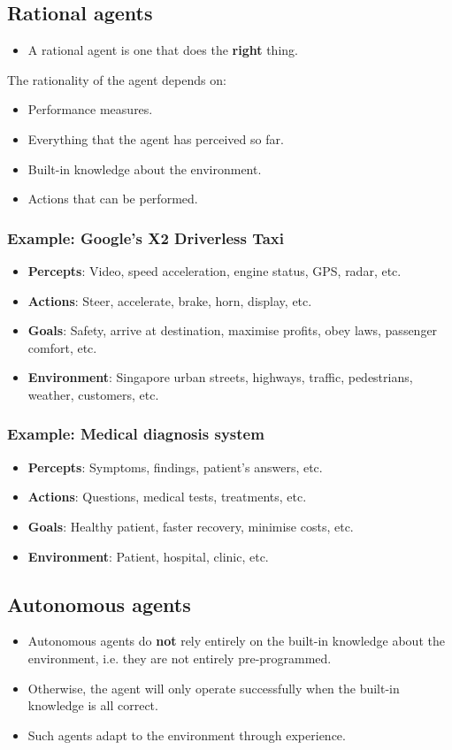 \documentclass[11pt]{article}
\begin{document}
\subsection{Rational agents}
\label{sec:org659cea3}
\begin{itemize}
\item A rational agent is one that does the \textbf{right} thing.
\end{itemize}
The rationality of the agent depends on:
\begin{itemize}
\item Performance measures.
\item Everything that the agent has perceived so far.
\item Built-in knowledge about the environment.
\item Actions that can be performed.
\end{itemize}
\subsubsection{Example: Google's X2 Driverless Taxi}
\label{sec:org53ce318}
\begin{itemize}
\item \textbf{Percepts}: Video, speed acceleration, engine status, GPS, radar, etc.
\item \textbf{Actions}: Steer, accelerate, brake, horn, display, etc.
\item \textbf{Goals}: Safety, arrive at destination, maximise profits, obey laws, passenger comfort, etc.
\item \textbf{Environment}: Singapore urban streets, highways, traffic, pedestrians, weather, customers, etc.
\end{itemize}
\subsubsection{Example: Medical diagnosis system}
\label{sec:org62a6ed9}
\begin{itemize}
\item \textbf{Percepts}: Symptoms, findings, patient's answers, etc.
\item \textbf{Actions}: Questions, medical tests, treatments, etc.
\item \textbf{Goals}: Healthy patient, faster recovery, minimise costs, etc.
\item \textbf{Environment}: Patient, hospital, clinic, etc.
\end{itemize}
\subsection{Autonomous agents}
\label{sec:org1ba6895}
\begin{itemize}
\item Autonomous agents do \textbf{not} rely entirely on the built-in knowledge about the environment, i.e. they are not entirely pre-programmed.
\item Otherwise, the agent will only operate successfully when the built-in knowledge is all correct.
\item Such agents adapt to the environment through experience.
\end{itemize}
\end{document}
